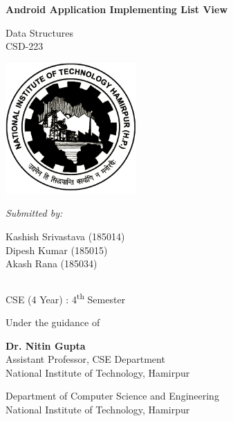 \documentclass[11pt,a4paper]{report}
\begin{document}
\begin{titlepage}
    \begin{center}

        \Huge{\textbf{Android Application Implementing List View}}
 
        \vspace{0.5cm}
        
        \normalsize
       
        \vspace{10pt}
        
    	Data Structures\\
        CSD-223

        
        
        \vspace{15pt}
        \includegraphics[height=5cm]{logo.png}
        
        \vspace{10pt}
        \textit{Submitted by:}

            Kashish Srivastava (185014)\\
            Dipesh Kumar (185015)\\
            Akash Rana (185034)
        \vspace{5pt}
        
        \begin{tabular}{c c}
            
        \end{tabular}
 
        \vspace{5pt}
        CSE (4 Year) : 
        4\textsuperscript{th} Semester
 
        \vspace{15pt}
 
        Under the guidance of
        
        \vspace{5pt}
        
        \textbf{Dr. Nitin Gupta }\\
        Assistant Professor, CSE Department\\
        National Institute of Technology, Hamirpur\\
 
        \vspace{25pt}
        
        \large
 
        Department of Computer Science and  Engineering\\
        National Institute of Technology, Hamirpur\\
      
    \end{center}
\end{titlepage}
\end{document}
